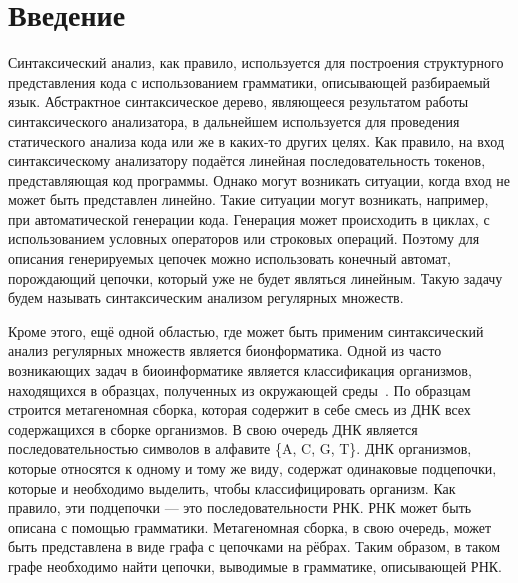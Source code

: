 \documentclass[14pt]{matmex-diploma-custom}
\begin{document}
\maketitle
\tableofcontents

\section*{Введение}

Синтаксический анализ, как правило, используется для построения структурного представления кода с использованием грамматики, описывающей разбираемый язык. Абстрактное синтаксическое дерево, являющееся результатом работы синтаксического анализатора, в дальнейшем используется для проведения статического анализа кода или же в каких-то других целях. Как правило, на вход синтаксическому анализатору подаётся линейная последовательность токенов, представляющая код программы. Однако могут возникать ситуации, когда вход не может быть представлен линейно. Такие ситуации могут возникать, например, при автоматической генерации кода. Генерация может происходить в циклах, с использованием условных операторов или строковых операций. Поэтому для описания генерируемых цепочек можно использовать конечный автомат, порождающий цепочки, который уже не будет являться линейным. Такую задачу будем называть синтаксическим анализом регулярных множеств.

Кроме этого, ещё одной областью, где может быть применим синтаксический анализ регулярных множеств является бионформатика. Одной из часто возникающих задач в биоинформатике является классификация организмов, находящихся в образцах, полученных из окружающей среды~\cite{bioRNA}. По образцам строится метагеномная сборка, которая содержит в себе смесь из ДНК всех содержащихся в сборке организмов. В свою очередь ДНК является последовательностью символов в алфавите \{A, C, G, T\}. ДНК организмов, которые относятся к одному и тому же виду, содержат одинаковые подцепочки, которые и необходимо выделить, чтобы классифицировать организм. Как правило, эти подцепочки --- это последовательности РНК. РНК может быть описана с помощью грамматики. Метагеномная сборка, в свою очередь, может быть представлена в виде графа с цепочками на рёбрах. Таким образом, в таком графе необходимо найти цепочки, выводимые в грамматике, описывающей РНК. 
\end{document}
